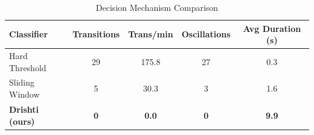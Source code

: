 \begin{table}[t]
\centering
\caption{Decision Mechanism Comparison}
\label{tab:baseline-comparison}
\begin{tabular}{lcccc}
\toprule
\textbf{Classifier} & \textbf{Transitions} & \textbf{Trans/min} & \textbf{Oscillations} & \textbf{Avg Duration (s)} \\
\midrule
        Hard Threshold & 29 & 175.8 & 27 & 0.3 \\
        Sliding Window & 5 & 30.3 & 3 & 1.6 \\
        \textbf{Drishti (ours)} & \textbf{0} & \textbf{0.0} & \textbf{0} & \textbf{9.9} \\
\bottomrule
\end{tabular}
\end{table}
